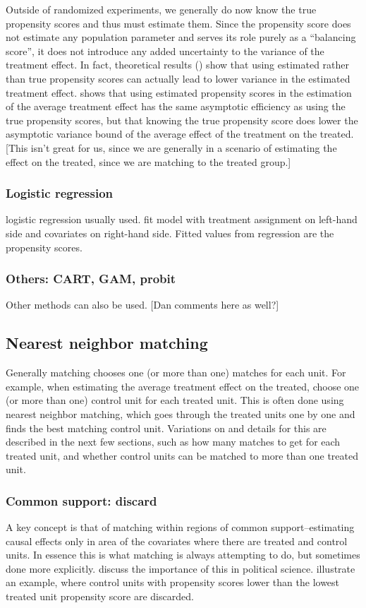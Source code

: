 \documentclass[11pt,titlepage]{article}
\begin{document}
Outside of randomized experiments, we generally do now know the true propensity 
scores and thus must estimate them.  Since the propensity score does not estimate any population
parameter and serves its role purely as a ``balancing score'', it does
not introduce any added uncertainty to the variance of the treatment
effect.  In fact, theoretical results (\cite{RubTho92b, RubTho96, HilRubTho99}) show that using estimated rather than true propensity scores
can actually lead to lower variance in the estimated treatment effect.  \cite{Hahn98} shows that using estimated propensity scores in the estimation
of the average treatment effect has the same asymptotic efficiency as using the true propensity scores, but that knowing the true propensity score
does lower the asymptotic variance bound of the average effect of the treatment on the treated.  [This isn't great for us, since we are generally in a scenario
of estimating the effect on the treated, since we are matching to the treated group.] 

\subsubsection{Logistic regression}
logistic regression usually used.  fit model with treatment assignment on left-hand side and covariates on right-hand side.
Fitted values from regression are the propensity scores.

\subsubsection{Others: CART, GAM, probit}
Other methods can also be used.  [Dan comments here as well?]

\subsection{Nearest neighbor matching}
\label{nearest}
Generally matching chooses one (or more than one) matches for each unit.  For example, when estimating the average treatment effect
on the treated, choose one (or more than one) control unit for each treated unit.  This is often done using nearest neighbor matching,
which goes through the treated units one by one and finds the best matching control unit. 
Variations on and details for this are described in the next few sections, such as how many matches to get for each treated unit, and whether control units
can be matched to more than one treated unit.


\subsubsection{Common support: discard}
A key concept is that of matching within regions of common support--estimating causal effects only in area of the covariates where
there are treated and control units.  In essence this is what matching is always attempting to do, but sometimes done more explicitly.
\cite{KinZen02} discuss the importance of this in political science.  \cite{DehWah99} illustrate an example, where control units with propensity 
scores lower than the lowest treated unit propensity score are discarded.  
\end{document}
